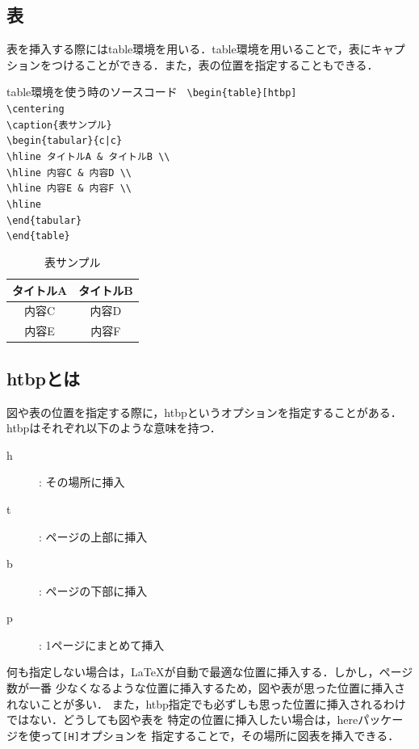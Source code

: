 \subsection{表}
表を挿入する際にはtable環境を用いる．table環境を用いることで，表にキャプションをつけることができる．また，表の位置を指定することもできる．
\begin{itembox}[c]{table環境を使う時のソースコード}
  \texttt{
  \hspace{-0.5\zw}\textbackslash begin\{table\}[htbp]\\
  \hspace{4\zw}\textbackslash centering\\
  \hspace{4\zw}\textbackslash caption\{表サンプル\}\\
  \hspace{4\zw}\textbackslash begin\{tabular\}\{c|c\}\\
  \hspace{6\zw}\textbackslash hline タイトルA \& タイトルB \textbackslash\textbackslash\\
  \hspace{6\zw}\textbackslash hline 内容C \& 内容D \textbackslash\textbackslash\\
  \hspace{6\zw}\textbackslash hline 内容E \& 内容F \textbackslash\textbackslash\\
  \hspace{6\zw}\textbackslash hline\\
  \hspace{4\zw}\textbackslash end\{tabular\}\\
  \textbackslash end\{table\}
  }
\end{itembox}
\begin{table}[htbp]
  \centering
  \caption{表サンプル}
  \begin{tabular}{c|c}
    \hline
    タイトルA & タイトルB \\
    \hline
    内容C   & 内容D   \\
    \hline
    内容E   & 内容F   \\
    \hline
  \end{tabular}
\end{table}
\subsection{htbpとは}
図や表の位置を指定する際に，htbpというオプションを指定することがある．htbpはそれぞれ以下のような意味を持つ．
\begin{description}
  \item[h]: その場所に挿入
  \item[t]: ページの上部に挿入
  \item[b]: ページの下部に挿入
  \item[p]: 1ページにまとめて挿入
\end{description}
何も指定しない場合は，\LaTeX が自動で最適な位置に挿入する．しかし，ページ数が一番
少なくなるような位置に挿入するため，図や表が思った位置に挿入されないことが多い．
また，htbp指定でも必ずしも思った位置に挿入されるわけではない．どうしても図や表を
特定の位置に挿入したい場合は，hereパッケージを使って\texttt{[H]}オプションを
指定することで，その場所に図表を挿入できる．